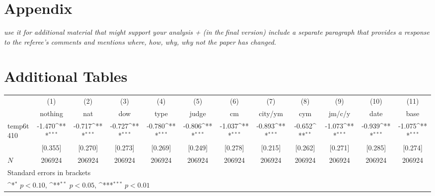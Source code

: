 \documentclass[11pt]{article}
\begin{document}
	\begin{subappendices}
		\appendix
		
		\section*{Appendix}\label{Appendix}
		\textit{use it for additional material that might support your analysis + (in thefinal version) include a separate paragraph that provides a response to the referee's comments and mentions where, how, why, why not the paper has changed.}
		\singlespacing
		\section{Additional Tables}\label{ASec:xxxxx}
		
		
		\begin{center}
			 \label{tab:title} 
			{
				{
					\def\sym#1{\ifmmode^{#1}\else\(^{#1}\)\fi}
					\begin{tabular}{l*{11}{c}}
						\hline\hline
						&\multicolumn{1}{c}{(1)}&\multicolumn{1}{c}{(2)}&\multicolumn{1}{c}{(3)}&\multicolumn{1}{c}{(4)}&\multicolumn{1}{c}{(5)}&\multicolumn{1}{c}{(6)}&\multicolumn{1}{c}{(7)}&\multicolumn{1}{c}{(8)}&\multicolumn{1}{c}{(9)}&\multicolumn{1}{c}{(10)}&\multicolumn{1}{c}{(11)}\\
						&\multicolumn{1}{c}{nothing}&\multicolumn{1}{c}{nat}&\multicolumn{1}{c}{dow}&\multicolumn{1}{c}{type}&\multicolumn{1}{c}{judge}&\multicolumn{1}{c}{cm}&\multicolumn{1}{c}{city/ym}&\multicolumn{1}{c}{cym}&\multicolumn{1}{c}{jm/c/y}&\multicolumn{1}{c}{date}&\multicolumn{1}{c}{base}\\
						\hline
						temp6t410   &      -1.470\sym{***}&      -0.717\sym{***}&      -0.727\sym{***}&      -0.780\sym{***}&      -0.806\sym{***}&      -1.037\sym{***}&      -0.893\sym{***}&      -0.652\sym{**} &      -1.073\sym{***}&      -0.939\sym{***}&      -1.075\sym{***}\\
						&     [0.355]         &     [0.270]         &     [0.273]         &     [0.269]         &     [0.249]         &     [0.278]         &     [0.215]         &     [0.262]         &     [0.271]         &     [0.285]         &     [0.274]         \\
						\hline
						\(N\)       &      206924         &      206924         &      206924         &      206924         &      206924         &      206924         &      206924         &      206924         &      206924         &      206924         &      206924         \\
						\hline\hline
						\multicolumn{12}{l}{\footnotesize Standard errors in brackets}\\
						\multicolumn{12}{l}{\footnotesize \sym{*} \(p<0.10\), \sym{**} \(p<0.05\), \sym{***} \(p<0.01\)}\\
					\end{tabular}
				}
				
}
\end{center}
\end{subappendices}
\end{document}
